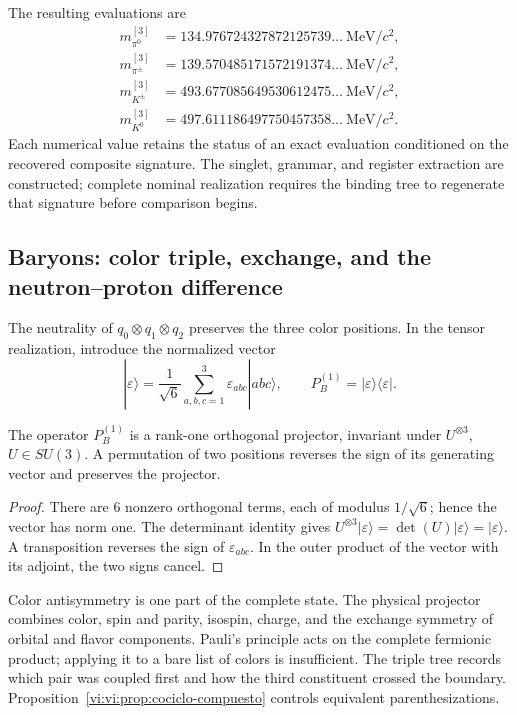 The resulting evaluations are
\begin{align*}
 m_{\pi^0}^{[3]}&=134.976724327872125739\ldots\ \mathrm{MeV}/c^2,\\
 m_{\pi^\pm}^{[3]}&=139.570485171572191374\ldots\ \mathrm{MeV}/c^2,\\
 m_{K^\pm}^{[3]}&=493.677085649530612475\ldots\ \mathrm{MeV}/c^2,\\
 m_{K^0}^{[3]}&=497.611186497750457358\ldots\ \mathrm{MeV}/c^2.
\end{align*}
Each numerical value retains the
status of an exact evaluation conditioned on the recovered composite
signature. The singlet, grammar, and register extraction are
constructed; complete nominal realization requires the binding
tree to regenerate that signature before comparison begins.

\subsection{Baryons: color triple, exchange, and the neutron--proton difference}
\label{vi:vi:subsec:bariones-familias}

The neutrality of \(q_0\otimes q_1\otimes q_2\) preserves the three
color positions. In the tensor realization, introduce the normalized
vector
\[
 |\varepsilon\rangle=\frac1{\sqrt6}
 \sum_{a,b,c=1}^3\varepsilon_{abc}|abc\rangle,
 \qquad P_B^{(1)}=|\varepsilon\rangle\langle\varepsilon|.
\]

\begin{proposition}
\label{vi:vi:prop:singlete-barion}
The operator \(P_B^{(1)}\) is a rank-one orthogonal projector,
invariant under \(U^{\otimes3}\), \(U\in SU(3)\). A permutation
of two positions reverses the sign of its generating vector and preserves
the projector.
\end{proposition}
\begin{proof}
There are \(6\) nonzero orthogonal terms, each of modulus
\(1/\sqrt6\); hence the vector has norm one. The determinant
identity gives
\(U^{\otimes3}|\varepsilon\rangle=
\det(U)|\varepsilon\rangle=|\varepsilon\rangle\).
A transposition reverses the sign of \(\varepsilon_{abc}\). In the
outer product of the vector with its adjoint, the two signs cancel.
\end{proof}

Color antisymmetry is one part of the complete state. The physical
projector combines color, spin and parity, isospin, charge, and the exchange
symmetry of orbital and flavor components. Pauli's principle
acts on the complete fermionic product; applying it to a bare
list of colors is insufficient. The triple tree records which pair was coupled
first and how the third constituent crossed the boundary.
Proposition~\ref{vi:vi:prop:cociclo-compuesto} controls equivalent
parenthesizations.

